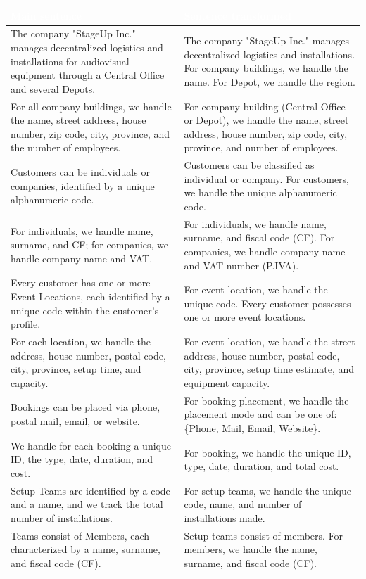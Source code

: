 \documentclass[12pt,a4paper]{article}
\begin{document}
\begin{center}
\renewcommand{\arraystretch}{1.4}
\small
\begin{tabularx}{0.95\textwidth}{|Y|Y|}
\hline
{}
\textcolor{white}{\textbf{Main sentence}} & \textcolor{white}{\textbf{Sentence transformed}} \\ \hline
The company "StageUp Inc." manages decentralized logistics and installations for audiovisual equipment through a Central Office and several Depots. & The company "StageUp Inc." manages decentralized logistics and installations. For company buildings, we handle the name. For Depot, we handle the region. \\ \hline
For all company buildings, we handle the name, street address, house number, zip code, city, province, and the number of employees. & For company building (Central Office or Depot), we handle the name, street address, house number, zip code, city, province, and number of employees. \\ \hline
Customers can be individuals or companies, identified by a unique alphanumeric code. & Customers can be classified as individual or company. For customers, we handle the unique alphanumeric code. \\ \hline
For individuals, we handle name, surname, and CF; for companies, we handle company name and VAT. & For individuals, we handle name, surname, and fiscal code (CF). For companies, we handle company name and VAT number (P.IVA). \\ \hline
Every customer has one or more Event Locations, each identified by a unique code within the customer's profile. & For event location, we handle the unique code. Every customer possesses one or more event locations. \\ \hline
For each location, we handle the address, house number, postal code, city, province, setup time, and capacity. & For event location, we handle the street address, house number, postal code, city, province, setup time estimate, and equipment capacity. \\ \hline
Bookings can be placed via phone, postal mail, email, or website. & For booking placement, we handle the placement mode and can be one of: \{Phone, Mail, Email, Website\}. \\ \hline
We handle for each booking a unique ID, the type, date, duration, and cost. & For booking, we handle the unique ID, type, date, duration, and total cost. \\ \hline
Setup Teams are identified by a code and a name, and we track the total number of installations. & For setup teams, we handle the unique code, name, and number of installations made. \\ \hline
Teams consist of Members, each characterized by a name, surname, and fiscal code (CF). & Setup teams consist of members. For members, we handle the name, surname, and fiscal code (CF). \\ \hline
\end{tabularx}
\end{center}
\end{document}
